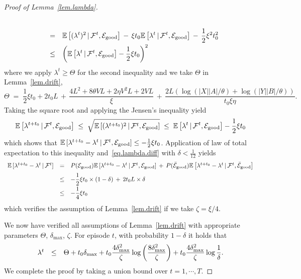 \documentclass[12pt, final]{l4dc2023}
\begin{document}
\begin{proof}[Proof of Lemma~\ref{lem.lambda}]
\[\begin{array}{rcl}
	\\[0.2cm]
	& = & \displaystyle \mathbb{E} \left[ (\lambda^{t})^2\,\vert\, {\mathcal{F}}^{t}, \mathcal{E}_{\text{good}} \right]
	\,-\,\xi t_0 \mathbb{E} \left[\lambda^t\,\vert\, {\mathcal{F}}^{t}, \mathcal{E}_{\text{good}} \right] \,-\,\frac{1}{2} \xi^2 t_0^2
	\\[0.2cm]
	& \leq & \displaystyle
	\left( \mathbb{E} \left[\lambda^{t}\,\vert\, {\mathcal{F}}^{t}, \mathcal{E}_{\text{good}} \right]- \frac{1}{2}\xi t_0 \right)^2
	\end{array}
	\]
	where we apply $\lambda^t\geq \Theta$ for the second inequality and we take $\Theta$ in Lemma~\ref{lem.drift},
	\[
	\Theta \;=\;
	\frac{1}{2}\xi t_0 +2 t_0L
	\,+\,\frac{4L^2 +8\theta V L+2\eta V^2 L
		+2 VL}{\xi}\,+\, \frac{2L(\log(|X||A|/\theta)+\log(|Y||B|/\theta)) }{t_0\xi\eta}.
	\]
	Taking the square root and applying the Jensen's inequality yield
	\[
	\mathbb{E} \left[ \lambda^{t+t_0} \,\vert\, {\mathcal{F}}^{t}, \mathcal{E}_{\text{good}} \right]
	\;\leq\;
	\sqrt{\mathbb{E} \left[ (\lambda^{t+t_0})^2 \,\vert\, {\mathcal{F}}^{t}, \mathcal{E}_{\text{good}} \right] }
	\;\leq\; 
	\mathbb{E} \left[\lambda^{t} \,\vert\, {\mathcal{F}}^{t}, \mathcal{E}_{\text{good}} \right]- \frac{1}{2}\xi t_0
	\]
	which shows that $\mathbb{E} \left[ \lambda^{t+t_0} -\lambda^{t}\,\vert\, {\mathcal{F}}^{t}, \mathcal{E}_{\text{good}} \right] \leq - \frac{1}{2}\xi t_0$. 
	Application of law of total expectation to this inequality and~\eqref{eq.lambda.diff} with $\delta < \frac{1}{12}$ yields
	\[
	\begin{array}{rcl}
	\mathbb{E} \left[ \lambda^{t+t_0} -\lambda^{t}\,\vert\, {\mathcal{F}}^{t} \right] 
	& = &
	P(\mathcal{E}_{\text{good}} )
	\mathbb{E} \left[ \lambda^{t+t_0} -\lambda^{t}\,\vert\, {\mathcal{F}}^{t}, \mathcal{E}_{\text{good}} \right]
	\,+\,
	P(\bar{\mathcal{E}}_{\text{good}})
	\mathbb{E} \left[ \lambda^{t+t_0} -\lambda^{t}\,\vert\, {\mathcal{F}}^{t}, \bar{\mathcal{E}}_{\text{good}} \right]
	\\[0.2cm]
	& \leq & - \dfrac{1}{2}\xi t_0 \times(1-\delta) \,+\,  2t_0L\times \delta
	\\[0.2cm]
	& \leq & - \dfrac{1}{4}\xi t_0
	\end{array}
	\]
	which verifies the assumption of Lemma~\ref{lem.drift} if we take $\zeta=\xi/4$.
	
	We now have verified all assumptions of Lemma~\ref{lem.drift} with appropriate parameters $\Theta$, $\delta_{\max}$, $\zeta$. For episode $t$, with probability $1-\delta$ it holds that 
	\[
	\begin{array}{rcl}
	\lambda^t & \leq & \displaystyle \Theta + t_0 \delta_{\max} + t_0 \frac{4\delta_{\max}^2}{\zeta} \log \left(\frac{8\delta_{\max}^2}{\zeta}\right) + t_0 \frac{4\delta_{\max}^2}{\zeta} \log\frac{1}{\delta}.
	\end{array}
	\]
	We complete the proof by taking a union bound over $t = 1,\cdots,T$.
\end{proof}
\end{document}
